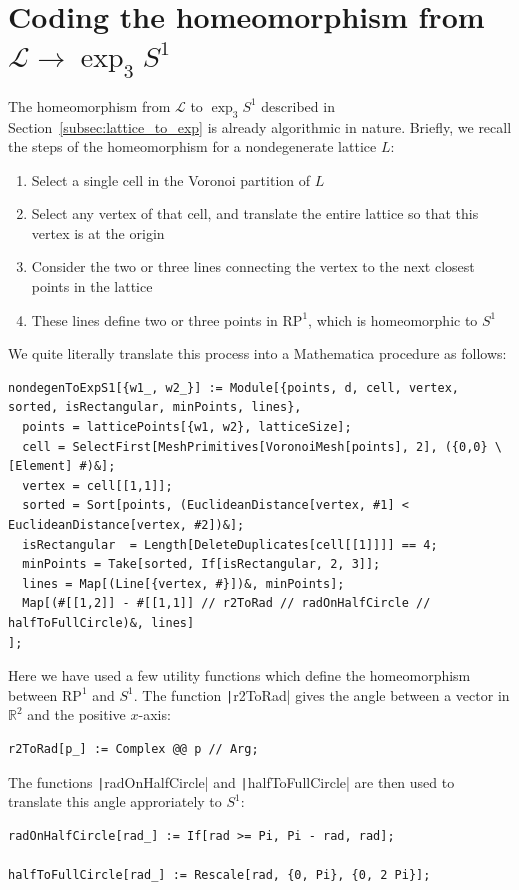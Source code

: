 \documentclass[12pt,twoside]{reedthesis}
\theoremstyle{definition}
\newcommand{\R}{\mathbb{R}}
\newcommand{\LS}{\mathcal{L}}
\begin{document}
\section{Coding the homeomorphism from $\LS \to \exp_3 S^1$}

The homeomorphism from $\LS$ to $\exp_3 S^1$ described in Section~\ref{subsec:lattice_to_exp} is already algorithmic in nature.
Briefly, we recall the steps of the homeomorphism for a nondegenerate lattice $L$:
\begin{enumerate}
  \item Select a single cell in the Voronoi partition of $L$
  \item Select any vertex of that cell, and translate the entire lattice so that this vertex is at the origin
  \item Consider the two or three lines connecting the vertex to the next closest points in the lattice
  \item These lines define two or three points in $\mathrm{RP}^1$, which is homeomorphic to $S^1$
\end{enumerate}
We quite literally translate this process into a Mathematica procedure as follows:
\begin{verbatim}
nondegenToExpS1[{w1_, w2_}] := Module[{points, d, cell, vertex, sorted, isRectangular, minPoints, lines},
  points = latticePoints[{w1, w2}, latticeSize];
  cell = SelectFirst[MeshPrimitives[VoronoiMesh[points], 2], ({0,0} \[Element] #)&];
  vertex = cell[[1,1]];
  sorted = Sort[points, (EuclideanDistance[vertex, #1] < EuclideanDistance[vertex, #2])&];
  isRectangular  = Length[DeleteDuplicates[cell[[1]]]] == 4;
  minPoints = Take[sorted, If[isRectangular, 2, 3]];
  lines = Map[(Line[{vertex, #}])&, minPoints];
  Map[(#[[1,2]] - #[[1,1]] // r2ToRad // radOnHalfCircle // halfToFullCircle)&, lines]
];
\end{verbatim}
Here we have used a few utility functions which define the homeomorphism between $\mathrm{RP}^1$ and $S^1$.
The function \texttt|r2ToRad| gives the angle between a vector in $\R^2$ and the positive $x$-axis:
\begin{verbatim}
r2ToRad[p_] := Complex @@ p // Arg;
\end{verbatim}
The functions \texttt|radOnHalfCircle| and \texttt|halfToFullCircle| are then used to translate this angle approriately to $S^1$:
\begin{verbatim}
radOnHalfCircle[rad_] := If[rad >= Pi, Pi - rad, rad];

halfToFullCircle[rad_] := Rescale[rad, {0, Pi}, {0, 2 Pi}];
\end{verbatim}
\end{document}
